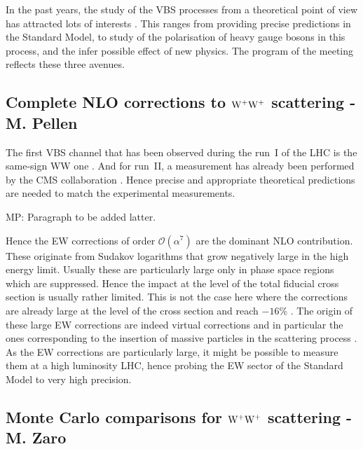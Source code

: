\newcommand{\MP}[1]{{ {\color{blue}{ [MP: #1]}} }}

In the past years, the study of the VBS processes from a theoretical point of view has attracted lots of interests \cite{Rauch:2016pai}.
This ranges from providing precise predictions in the Standard Model, to study of the polarisation of heavy gauge bosons in this process, and the infer possible effect of new physics.
The program of the meeting reflects these three avenues.

\subsection{Complete NLO corrections to ${\rm W^+ W^+}$ scattering - M. Pellen}

The first VBS channel that has been observed during the run~I of the LHC is the same-sign WW one \cite{Aad:2014zda,Aaboud:2016ffv,Khachatryan:2014sta}.
And for run~II, a measurement has already been performed by the CMS collaboration \cite{CMS:2017adb}.
Hence precise and appropriate theoretical predictions are needed to match the experimental measurements.

MP: Paragraph to be added latter.

Hence the EW corrections of order $\mathcal{O}\left(\alpha^7\right)$ are the dominant NLO contribution.
These originate from Sudakov logarithms that grow negatively large in the high energy limit.
Usually these are particularly large only in phase space regions which are suppressed.
Hence the impact at the level of the total fiducial cross section is usually rather limited.
This is not the case here where the corrections are already large at the level of the cross section and reach $-16\%$ \cite{Biedermann:2016yds}.
The origin of these large EW corrections are indeed virtual corrections and in particular the ones corresponding to the insertion of massive particles in the scattering process \cite{Biedermann:2016yds}.
As the EW corrections are particularly large, it might be possible to measure them at a high luminosity LHC, hence probing the EW sector of the Standard Model to very high precision.

\subsection{Monte Carlo comparisons for ${\rm W^+ W^+}$ scattering - M. Zaro}

